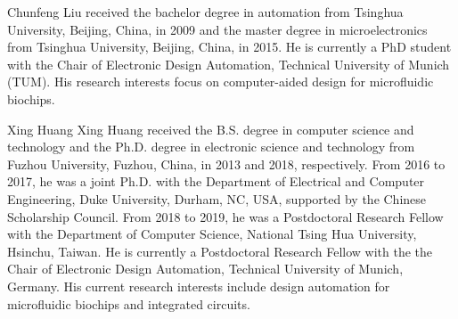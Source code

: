 \begin{IEEEbiography}
{Chunfeng Liu} 
received the bachelor degree in automation from Tsinghua University, Beijing,
China, in 2009 and the master degree in microelectronics from Tsinghua
University, Beijing, China, in 2015. He is currently a PhD student with the Chair
of Electronic Design Automation, Technical University of Munich (TUM). His research interests focus on
computer-aided design for microfluidic biochips. 
\end{IEEEbiography}
\vskip -27.7pt
\begin{IEEEbiography}
{Xing Huang} 
Xing Huang received the B.S. degree in computer science and technology 
and the Ph.D. degree in electronic science and technology from Fuzhou University, Fuzhou, China, in 2013 and 2018, respectively. 
From 2016 to 2017, he was a joint Ph.D. with the Department of Electrical and Computer Engineering, Duke University, Durham, NC, USA, 
supported by the Chinese Scholarship Council. 
From 2018 to 2019, he was a  Postdoctoral Research Fellow with the Department of Computer Science, National Tsing Hua University, Hsinchu, Taiwan.   
He is currently a Postdoctoral Research Fellow with the the Chair of Electronic Design Automation, Technical University of Munich, Germany. 
His current research interests include design automation for microfluidic biochips and integrated circuits.
\end{IEEEbiography}
\vskip -27.7pt

